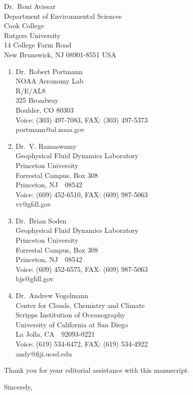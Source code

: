 \documentclass[12pt,twoside]{ncarletter}
\begin{document}
\begin{letter}{%
Dr.~Roni Avissar\\
Department of Environmental Sciences\\
Cook College\\
Rutgers University\\
14 College Farm Road\\
New Brunswick, NJ 08901-8551 USA}
\begin{enumerate}
\item Dr.~Robert Portmann\\
NOAA Aeronomy Lab\\
R/E/AL8\\
325 Broadway\\
Boulder, CO 80303\\
Voice: (303) 497-7083, FAX: (303) 497-5373\\
portmann@al.noaa.gov
\item Dr.~V. Ramaswamy\\
Geophysical Fluid Dynamics Laboratory\\
Princeton University\\
Forrestal Campus, Box 308\\
Princeton, NJ~~08542\\
Voice: (609) 452-6510, FAX: (609) 987-5063\\
vr@gfdl.gov
\item Dr.~Brian Soden\\
Geophysical Fluid Dynamics Laboratory\\
Princeton University\\
Forrestal Campus, Box 308\\
Princeton, NJ~~08542\\
Voice: (609) 452-6575, FAX: (609) 987-5063\\
bjs@gfdl.gov
\item Dr.~Andrew Vogelmann\\
Center for Clouds, Chemistry and Climate\\
Scripps Institution of Oceanography\\
University of California at San Diego\\
La Jolla, CA~~92093-0221\\
Voice: (619) 534-6472, FAX: (619) 534-4922\\
andy@fiji.ucsd.edu
\end{enumerate}

Thank you for your editorial assistance with this manuscript. 

\closing{Sincerely,}


\end{letter}
\end{document}
